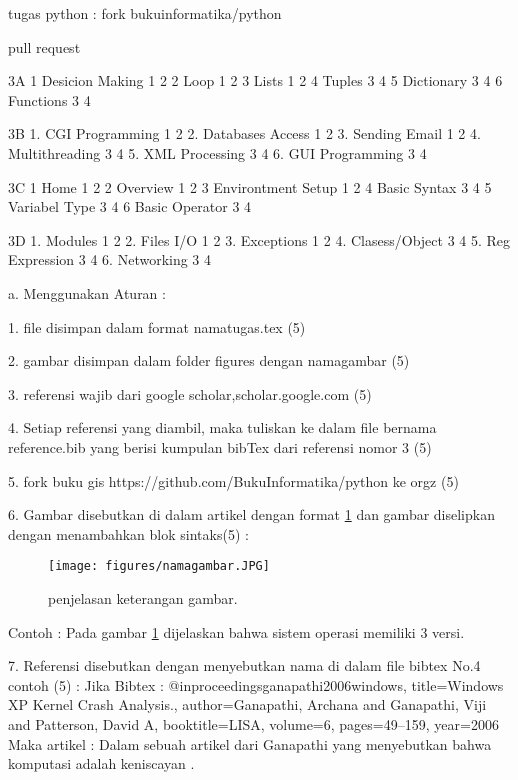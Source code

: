tugas python :
fork bukuinformatika/python

pull request

3A
1 Desicion Making 1 2
2 Loop  1 2
3 Lists 1 2 
4 Tuples 3 4 
5 Dictionary 3 4 
6 Functions 3 4

3B 
1. CGI Programming 1 2
2. Databases Access 1 2 
3. Sending Email 1 2
4. Multithreading 3 4
5. XML Processing 3 4
6. GUI Programming 3 4

3C
1 Home 1 2
2 Overview 1 2
3 Environtment Setup 1 2
4 Basic Syntax 3 4
5 Variabel Type 3 4
6 Basic Operator 3 4


3D
1. Modules 1 2
2. Files I/O 1 2 
3. Exceptions 1 2 
4. Clasess/Object 3 4 
5. Reg Expression 3 4 
6. Networking 3 4





a. Menggunakan Aturan : 

		1. file disimpan dalam format namatugas.tex (5)

		2. gambar disimpan dalam folder figures dengan namagambar (5)

		3. referensi wajib dari google scholar,scholar.google.com (5)

		4. Setiap referensi yang diambil, maka tuliskan ke dalam 
			file bernama reference.bib
		   yang berisi kumpulan bibTex dari referensi nomor 3 (5)

		5. fork buku gis https://github.com/BukuInformatika/python ke orgz (5)

		6. Gambar disebutkan di dalam artikel dengan format \ref{namagambar}
		   dan gambar diselipkan dengan menambahkan blok sintaks(5) :
			\begin{figure}[ht]
			\centerline{\texttt{[image: figures/namagambar.JPG]}}
			\caption{penjelasan keterangan gambar.}
			\label{namagambar}
			\end{figure}
			Contoh :
			Pada gambar \ref{namagambar} dijelaskan bahwa sistem operasi memiliki 
			3 versi.
	
		7. Referensi disebutkan dengan menyebutkan nama di dalam file bibtex No.4
		   contoh (5) :
			Jika Bibtex :
			@inproceedings{ganapathi2006windows,
			  title={Windows XP Kernel Crash Analysis.},
			  author={Ganapathi, Archana and Ganapathi, Viji and Patterson, David A},
			  booktitle={LISA},
			  volume={6},
			  pages={49--159},
			  year={2006}
			}
			Maka artikel :
			Dalam sebuah artikel dari Ganapathi yang menyebutkan bahwa komputasi 
			adalah keniscayan \cite{ganapathi2006windows}.
	
